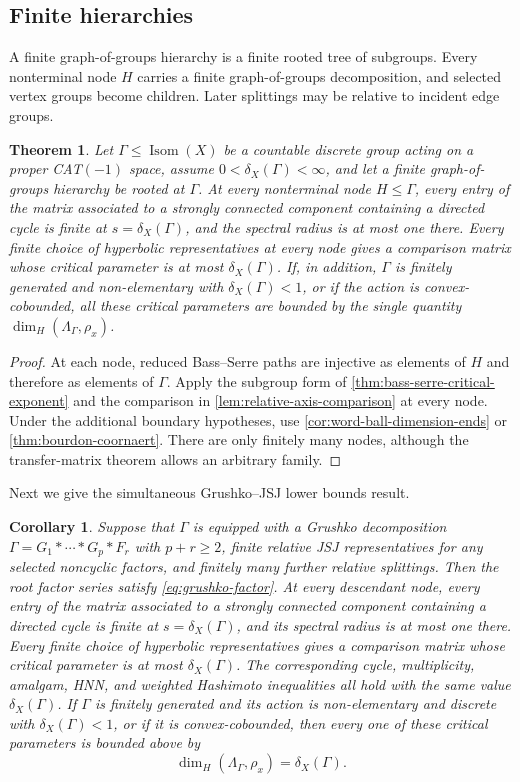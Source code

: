 \documentclass[11pt]{article}
\newtheorem{theorem}{Theorem}[section]
\newtheorem{corollary}[corollary]{Corollary}
\theoremstyle{definition}
\newcommand{\Isom}{\operatorname{Isom}}
\begin{document}
\subsection{Finite hierarchies}
A finite graph-of-groups hierarchy is a finite rooted tree of subgroups.  Every nonterminal
node $H$ carries a finite graph-of-groups decomposition, and selected vertex groups become
children.  Later splittings may be relative to incident edge groups.

\begin{theorem}
\label{thm:hierarchy}
Let $\Gamma\le\Isom(X)$ be a countable discrete group acting on a proper CAT$(-1)$ space,
assume $0<\delta_X(\Gamma)<\infty$, and let a finite graph-of-groups hierarchy be rooted at
$\Gamma$.  At every nonterminal node $H\le\Gamma$, every entry of the matrix associated to a strongly
connected component containing a directed cycle is finite at $s=\delta_X(\Gamma)$, and the
spectral radius is at most one there.  Every finite choice of hyperbolic representatives at
every node gives a comparison matrix whose critical parameter is at most
$\delta_X(\Gamma)$.  If, in addition, $\Gamma$ is finitely generated and non-elementary
with $\delta_X(\Gamma)<1$, or if the action is convex-cobounded, all these critical
parameters are bounded by the single quantity
$\dim_H(\Lambda_\Gamma,\rho_x)$.
\end{theorem}

\begin{proof}
At each node, reduced Bass--Serre paths are injective as elements of $H$ and therefore as
elements of $\Gamma$.  Apply the subgroup form of \cref{thm:bass-serre-critical-exponent} and the comparison in \cref{lem:relative-axis-comparison} at every node.  Under the additional boundary hypotheses, use \cref{cor:word-ball-dimension-ends} or \cref{thm:bourdon-coornaert}.  There are only finitely many nodes, although the transfer-matrix theorem allows an arbitrary family.
\end{proof}
Next we give the simultaneous Grushko--JSJ lower bounds result.
\begin{corollary}
\label{cor:hierarchy-dimension}
Suppose that $\Gamma$ is equipped with a Grushko decomposition
$\Gamma=G_1*\cdots*G_p*F_r$ with $p+r\ge2$, finite relative JSJ representatives for any
selected noncyclic factors, and finitely many further relative splittings.  Then the root
factor series satisfy \eqref{eq:grushko-factor}.  At every descendant node, every entry of the matrix associated to a strongly connected
component containing a directed cycle is finite at $s=\delta_X(\Gamma)$, and its spectral
radius is at most one there.  Every finite choice of hyperbolic representatives gives a
comparison matrix whose critical parameter is at most $\delta_X(\Gamma)$.  The corresponding cycle, multiplicity, amalgam, HNN, and weighted
Hashimoto inequalities all hold with the same value $\delta_X(\Gamma)$.  If $\Gamma$ is finitely generated and its action is
non-elementary and discrete with $\delta_X(\Gamma)<1$, or if it is
convex-cobounded, then every one of these critical parameters is bounded above by
\[
 \dim_H(\Lambda_\Gamma,\rho_x)=\delta_X(\Gamma).
\]
\end{corollary}
\end{document}

